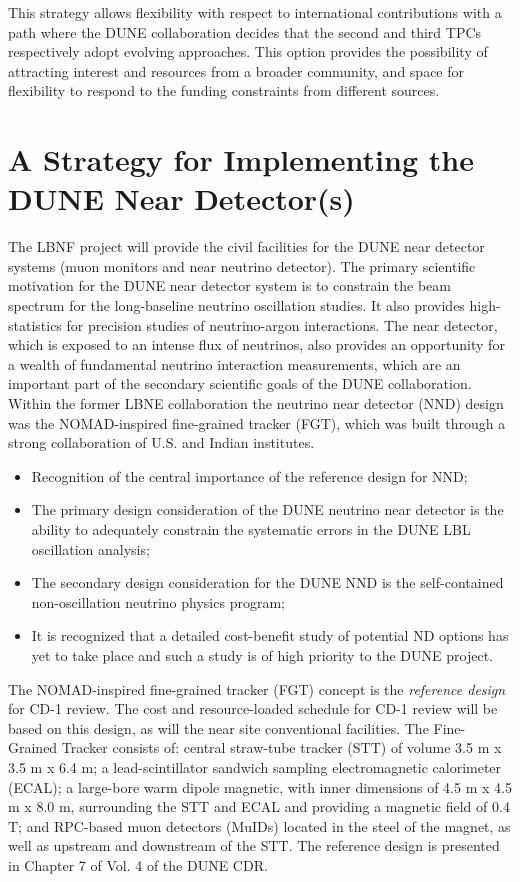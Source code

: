 This strategy allows flexibility with respect to international contributions with 
a path where the DUNE collaboration decides that the second and third TPCs respectively 
adopt evolving approaches. This option provides the possibility of attracting interest 
and resources from a broader community, and space for flexibility to respond to 
the funding constraints from different sources. 

\section{A Strategy for Implementing the DUNE Near Detector(s)}

The LBNF project will provide the civil facilities for the DUNE near detector systems 
(muon monitors and near neutrino detector). The primary scientific motivation for 
the DUNE near detector system is to constrain the beam spectrum for the long-baseline 
neutrino oscillation studies. It also provides high-statistics for precision studies 
of neutrino-argon interactions. The near detector, which is exposed to an intense 
flux of neutrinos, also provides an opportunity for a wealth of fundamental neutrino 
interaction measurements, which are an important part of the secondary scientific 
goals of the DUNE collaboration. Within the former LBNE collaboration the neutrino 
near detector (NND) design was the NOMAD-inspired fine-grained tracker (FGT), which 
was built through a strong collaboration of U.S. and Indian institutes.

\begin{itemize}
\item Recognition of the central importance of the reference design for NND;

\item  The primary design consideration of the DUNE neutrino near detector is the 
ability to adequately constrain the systematic errors in the DUNE LBL oscillation 
analysis; 
\item The secondary design consideration for the DUNE NND is the self-contained non-oscillation 
neutrino physics program;

\item It is recognized that a detailed cost-benefit study of potential ND options 
has yet to take place and such a study is of high priority to the DUNE project.
\end{itemize}

The NOMAD-inspired fine-grained tracker (FGT) concept is the \textit{reference 
design} for CD-1 review. The cost and resource-loaded schedule for CD-1 review 
will be based on this design, as will the near site conventional facilities. The 
Fine-Grained Tracker consists of:  central straw-tube tracker (STT) of volume 3.5 
m x 3.5 m x 6.4 m; a lead-scintillator sandwich sampling electromagnetic calorimeter 
(ECAL); a large-bore warm dipole magnetic, with inner dimensions of 4.5 m x 4.5 
m x 8.0 m, surrounding the STT and ECAL and providing a magnetic field of 0.4 T; 
and RPC-based muon detectors (MuIDs) located in the steel of the magnet, as well 
as upstream and downstream of the STT. The reference design is presented in Chapter 
7 of Vol. 4 of the DUNE CDR. 

